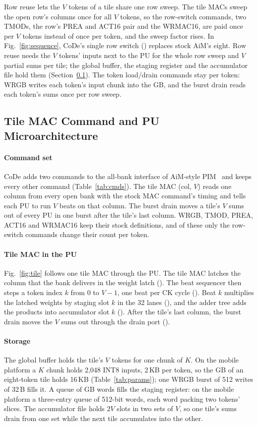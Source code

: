 Row reuse lets the $V$ tokens of a tile share one row sweep. The tile MACs sweep the open row's columns once for all
$V$ tokens, so the row-switch commands, two TMODs, the row's PREA and ACT16 pair and the WRMAC16, are paid once per $V$
tokens instead of once per token, and the sweep factor rises. In Fig.~\ref{fig:sequence}, CoDe's single row switch
() replaces stock AiM's eight. Row reuse needs the $V$ tokens' inputs next to the PU for the whole row sweep
and $V$ partial sums per tile; the global buffer, the staging register and the accumulator file hold them
(Section~\ref{sec:design:pu}). The token load/drain commands stay per token: WRGB writes each token's input chunk into
the GB, and the burst drain reads each token's sums once per row sweep.

\subsection{Tile MAC Command and PU Microarchitecture}
\label{sec:design:pu}

\paragraph{Command set}
CoDe adds two commands to the all-bank interface of AiM-style PIM~\cite{aimjssc} and keeps every other command
(Table~\ref{tab:cmds}). The tile MAC (col, $V$) reads one column from every open bank with the stock MAC command's
timing and tells each PU to run $V$ beats on that column. The burst drain moves a tile's $V$ sums out of every PU in
one burst after the tile's last column. WRGB, TMOD, PREA, ACT16 and WRMAC16 keep their stock definitions, and of these
only the row-switch commands change their count per token.


\paragraph{Tile MAC in the PU}
Fig.~\ref{fig:tile} follows one tile MAC through the PU. The tile MAC latches the column that the bank delivers in the
weight latch (). The beat sequencer then steps a token index $k$ from 0 to $V-1$, one beat per CK cycle
(). Beat $k$ multiplies the latched weights by staging slot $k$ in the 32 lanes (), and the adder
tree adds the products into accumulator slot $k$ (). After the tile's last column, the burst drain moves the
$V$ sums out through the drain port ().

\paragraph{Storage}
The global buffer holds the tile's $V$ tokens for one chunk of $K$. On the mobile platform a $K$ chunk holds 2,048 INT8
inputs, 2\,KB per token, so the GB of an eight-token tile holds 16\,KB (Table~\ref{tab:params}); one WRGB burst of 512
writes of 32\,B fills it. A queue of GB words fills the staging register: on the mobile platform a three-entry queue of
512-bit words, each word packing two tokens' slices. The accumulator file holds $2V$ slots in two sets of $V$, so one
tile's sums drain from one set while the next tile accumulates into the other.


